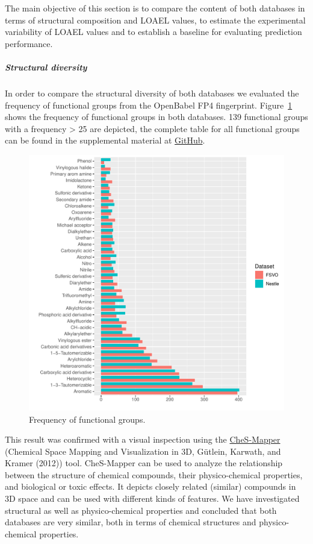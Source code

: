 \documentclass[]{achemso}
\let\oldsubparagraph\subparagraph
\renewcommand{\subparagraph}[1]{\oldsubparagraph{#1}\mbox{}}
\begin{document}
The main objective of this section is to compare the content of both
databases in terms of structural composition and LOAEL values, to
estimate the experimental variability of LOAEL values and to establish a
baseline for evaluating prediction performance.

\subparagraph{Structural diversity}\label{structural-diversity}

In order to compare the structural diversity of both databases we
evaluated the frequency of functional groups from the OpenBabel FP4
fingerprint. Figure~\ref{fig:fg} shows the frequency of functional
groups in both databases. 139 functional groups with a frequency
\textgreater{} 25 are depicted, the complete table for all functional
groups can be found in the supplemental material at
\href{https://github.com/opentox/loael-paper/blob/revision/data/functional-groups.csv}{GitHub}.

\begin{figure}
\centering
\includegraphics{figures/functional-groups.pdf}
\caption{Frequency of functional groups.}\label{fig:fg}
\end{figure}

This result was confirmed with a visual inspection using the
\href{http://ches-mapper.org}{CheS-Mapper} (Chemical Space Mapping and
Visualization in 3D, Gütlein, Karwath, and Kramer (2012)) tool.
CheS-Mapper can be used to analyze the relationship between the
structure of chemical compounds, their physico-chemical properties, and
biological or toxic effects. It depicts closely related (similar)
compounds in 3D space and can be used with different kinds of features.
We have investigated structural as well as physico-chemical properties
and concluded that both databases are very similar, both in terms of
chemical structures and physico-chemical properties.
\end{document}
